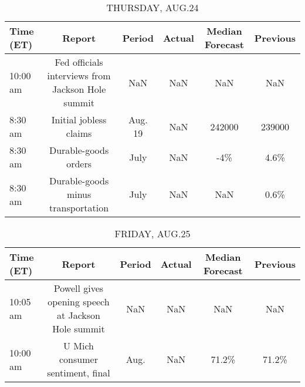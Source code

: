 \documentclass{article}%
\begin{document}
%


\begin{table}[htbp]%
\caption{THURSDAY, AUG.24}%
\centering%
\begin{adjustbox}{width=1\textwidth}%
\begin{tabular}{lccccc}
\toprule
Time (ET) &                                            Report &  Period & Actual & Median Forecast & Previous \\
\midrule
 10:00 am & Fed officials interviews from Jackson Hole summit &     NaN &    NaN &             NaN &      NaN \\
  8:30 am &                            Initial jobless claims & Aug. 19 &    NaN &          242000 &   239000 \\
  8:30 am &                              Durable-goods orders &    July &    NaN &             -4\% &     4.6\% \\
  8:30 am &                Durable-goods minus transportation &    July &    NaN &             NaN &     0.6\% \\
\bottomrule
\end{tabular}
%
\end{adjustbox}%
\end{table}

%


\begin{table}[htbp]%
\caption{FRIDAY, AUG.25}%
\centering%
\begin{adjustbox}{width=1\textwidth}%
\begin{tabular}{lccccc}
\toprule
Time (ET) &                                             Report & Period & Actual & Median Forecast & Previous \\
\midrule
 10:05 am & Powell gives opening speech at Jackson Hole summit &    NaN &    NaN &             NaN &      NaN \\
 10:00 am &                   U Mich consumer sentiment, final &   Aug. &    NaN &           71.2\% &    71.2\% \\
\bottomrule
\end{tabular}
%
\end{adjustbox}%
\end{table}
\end{document}
